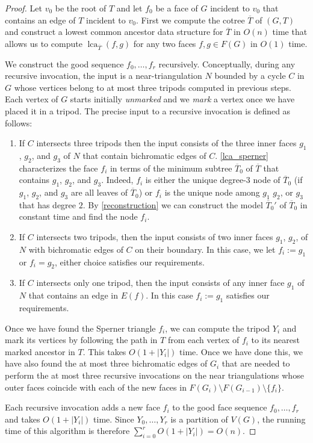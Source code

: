 \documentclass{patmorin}
\DeclareMathOperator{\lca}{lca}
\begin{document}
\begin{proof}
  Let $v_0$ be the root of $T$ and let $f_0$ be a face of $G$ incident to $v_0$  that contains an edge of $T$ incident to $v_0$.  First we compute the cotree $\overline{T}$ of $(G,T)$ and construct a lowest common ancestor data structure for $\overline{T}$ in $O(n)$ time that allows us to compute $\lca_{\overline{T}}(f,g)$ for any two faces $f,g\in F(G)$ in $O(1)$ time.

  We construct the good sequence $f_0,\ldots,f_{r}$ recursively. Conceptually, during any recursive invocation, the input is a near-triangulation $N$ bounded by a cycle $C$ in $G$ whose vertices belong to at most three tripods computed in previous steps.  Each vertex of $G$ starts initially \emph{unmarked} and we \emph{mark} a vertex once we have placed it in a tripod.  The precise input to a recursive invocation is defined as follows:
  \begin{enumerate}
    \item If $C$ intersects three tripods then the input consists of the three inner faces $g_1$, $g_2$, and $g_3$ of $N$ that contain bichromatic edges of $C$.  \cref{lca_sperner} characterizes the face $f_i$ in terms of the minimum subtree $\overline{T}_0$ of $\overline{T}$ that contains $g_1$, $g_2$, and $g_3$.  Indeed, $f_i$ is either the unique degree-$3$ node of $\overline{T}_0$ (if $g_1$, $g_2$, and $g_3$ are all leaves of $\overline{T}_0$) or $f_i$ is the unique node among $g_1$ $g_2$, or $g_3$ that has degree $2$.  By \cref{reconstruction} we can construct the model $\overline{T}_0'$ of $\overline{T}_0$ in constant time and find the node $f_i$.

    \item If $C$ intersects two tripods, then the input consists of two inner faces $g_1$, $g_2$, of $N$ with bichromatic edges of $C$ on their boundary.  In this case, we let $f_i:=g_1$ or $f_i=g_2$, either choice satisfies our requirements.

    \item If $C$ intersects only one tripod, then the input consists of any inner face $g_1$ of $N$ that contains an edge in $E(f)$.  In this case $f_i:=g_1$ satisfies our requirements.
\end{enumerate}
Once we have found the Sperner triangle $f_i$, we can compute the tripod $Y_i$ and mark its vertices by following the path in $T$ from each vertex of $f_i$ to its nearest marked ancestor in $T$.  This takes $O(1+|Y_i|)$ time.  Once we have done this, we have also found the at most three bichromatic edges of $G_i$ that are needed to perform the at most three recursive invocations on the near triangulations whose outer faces coincide with each of the new faces in $F(G_i)\setminus F(G_{i-1})\setminus\{f_i\}$.

Each recursive invocation adds a new face $f_i$ to the good face sequence $f_0,\ldots,f_{r}$ and takes $O(1+|Y_i|)$ time.  Since $Y_0,\ldots,Y_{r}$ is a partition of $V(G)$, the running time of this algorithm is therefore $\sum_{i=0}^{r} O(1+|Y_i|) = O(n)$.
\end{proof}
\end{document}
